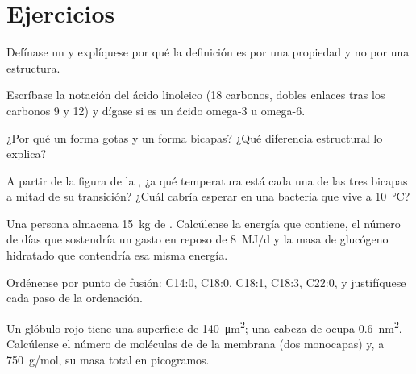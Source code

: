 \section{Ejercicios}

\begin{exercise}[$\star$]\label{exo:b1:lipids:1}
Defínase un  y explíquese por qué la definición es por una propiedad y
no por una estructura.
\end{exercise}

\begin{exercise}[$\star$]\label{exo:b1:lipids:2}
Escríbase la notación del ácido linoleico (18 carbonos, dobles enlaces tras
los carbonos 9 y 12) y dígase si es un ácido omega-3 u omega-6.
\end{exercise}

\begin{exercise}[$\star$]\label{exo:b1:lipids:3}
¿Por qué un  forma gotas y un  forma bicapas? ¿Qué
diferencia estructural lo explica?
\end{exercise}

\begin{exercise}[$\star$]\label{exo:b1:lipids:4}
A partir de la figura de la , ¿a qué temperatura está cada una de las
tres bicapas a mitad de su transición? ¿Cuál cabría esperar en una bacteria
que vive a \qty{10}{\celsius}?
\end{exercise}

\begin{exercise}[$\star\star$]\label{exo:b1:lipids:5}
Una persona almacena \qty{15}{kg} de . Calcúlense la energía que
contiene, el número de días que sostendría un gasto en reposo de
\qty{8}{MJ/d} y la masa de glucógeno hidratado que contendría esa misma
energía.
\end{exercise}

\begin{exercise}[$\star\star$]\label{exo:b1:lipids:6}
Ordénense por punto de fusión: C14:0, C18:0, C18:1, C18:3, C22:0, y
justifíquese cada paso de la ordenación.
\end{exercise}

\begin{exercise}[$\star\star$]\label{exo:b1:lipids:7}
Un glóbulo rojo tiene una superficie de \qty{140}{\micro m^2}; una cabeza de
 ocupa \qty{0.6}{nm^2}. Calcúlense el número de moléculas de
 de la membrana (dos monocapas) y, a \qty{750}{g/mol}, su masa
total en picogramos.
\end{exercise}

